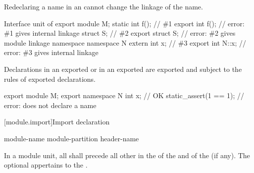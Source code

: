 \pnum
\begin{note}
Redeclaring a name in an 
cannot change the linkage of the name.
\begin{example}
\begin{codeblocktu}{Interface unit of }
export module M;
static int f();                 // \#1
export int f();                 // error: \#1 gives internal linkage
struct S;                       // \#2
export struct S;                // error: \#2 gives module linkage
namespace {
  namespace N {
    extern int x;               // \#3
  }
}
export int N::x;                // error: \#3 gives internal linkage
\end{codeblocktu}
\end{example}
\end{note}

\pnum
\begin{note}
Declarations in an exported  
or in an exported 
are exported and subject to the rules of exported declarations.
\begin{example}
\begin{codeblock}
export module M;
export namespace N {
  int x;                        // OK
  static_assert(1 == 1);        // error: does not declare a name
}
\end{codeblock}
\end{example}
\end{note}

[module.import]{Import declaration}%

\begin{bnf}
\br
      module-name  \terminal{;}\br
      module-partition  \terminal{;}\br
      header-name  \terminal{;}
\end{bnf}

\pnum
In a module unit, all 
shall precede all other  in
the  of the
and of the  (if any).
The optional 
appertains to the .

